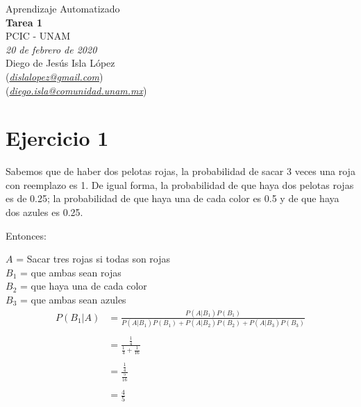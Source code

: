 \documentclass[letterpaper,12pt]{memoir}
\theoremstyle{definition}
\begin{document}
\begin{center}
  {\large Aprendizaje Automatizado}\\
  \vspace{0.2cm}
  {\large\bfseries Tarea 1}\\
  \vspace{0.2cm}
  {\large PCIC - UNAM}\\
  \vspace{0.5cm}
  {\itshape 20 de febrero de 2020}\\
  \vspace{0.5cm}
  Diego de Jesús Isla López\\
  (\href{mailto:dislalopez@gmail.com}{\itshape dislalopez@gmail.com})\\
  (\href{mailto:diego.isla@comunidad.unam.mx}{\itshape diego.isla@comunidad.unam.mx})\\
\end{center}


\section*{Ejercicio 1}

Sabemos que de haber dos pelotas rojas, la probabilidad de sacar 3 veces una roja con reemplazo es 1. De igual forma, la probabilidad de que haya dos pelotas rojas es de 0.25; la probabilidad de que haya una de cada color es 0.5 y de que haya dos azules es 0.25.

Entonces:

\(A\) = Sacar tres rojas si todas son rojas\\
\(B_1\) = que ambas sean rojas\\
\(B_2\) = que haya una de cada color\\
\(B_3\) = que ambas sean azules\\

\begin{align*}
  P(B_1|A) &= \frac{P(A|B_1)P(B_1)}{P(A|B_1)P(B_1)+P(A|B_2)P(B_2)+
  P(A|B_3)P(B_3)}\\
  \\
         &= \frac{\frac{1}{4}}{ \frac{1}{4} + \frac{1}{16}}\\
         \\
         &= \frac{\frac{1}{4}}{ \frac{5}{16}}\\
         \\
         &= \frac{4}{5}\\
         \\
\end{align*}
\end{document}
